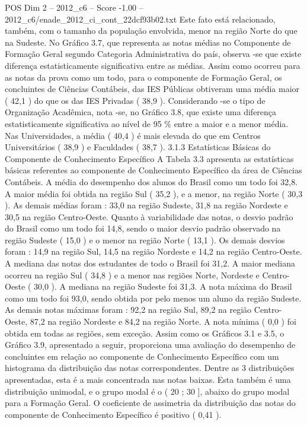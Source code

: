 \begin{textsample}{POS Dim 2 – 2012\_c6 – Score -1.00 – 2012\_c6/enade\_2012\_ci\_cont\_22dcf93b02.txt}
Este fato está relacionado, também, com o tamanho da população envolvida, menor na região Norte do que na Sudeste.
No Gráfico 3.7, que representa as notas médias no Componente de Formação Geral segundo Categoria Administrativa do país, observa -se que existe diferença estatisticamente significativa entre as médias.
Assim como ocorreu para as notas da prova como um todo, para o componente de Formação Geral, os concluintes de Ciências Contábeis, das IES Públicas obtiveram uma média maior ( 42,1 ) do que os das IES Privadas ( 38,9 ).
Considerando -se o tipo de Organização Acadêmica, nota -se, no Gráfico 3.8, que existe uma diferença estatisticamente significativa ao nível de 95 \% entre a maior e a menor média.
Nas Universidades, a média ( 40,4 ) é mais elevada do que em Centros Universitários ( 38,9 ) e Faculdades ( 38,7 ). 3.1.3 Estatísticas Básicas do Componente de Conhecimento Específico A Tabela 3.3 apresenta as estatísticas básicas referentes ao componente de Conhecimento Específico da área de Ciências Contábeis.
A média do desempenho dos alunos do Brasil como um todo foi 32,8.
A maior média foi obtida na região Sul ( 35,2 ), e a menor, na região Norte ( 30,3 ).
As demais médias foram : 33,0 na região Sudeste, 31,8 na região Nordeste e 30,5 na região Centro-Oeste.
Quanto à variabilidade das notas, o desvio padrão do Brasil como um todo foi 14,8, sendo o maior desvio padrão observado na região Sudeste ( 15,0 ) e o menor na região Norte ( 13,1 ).
Os demais desvios foram : 14,9 na região Sul, 14,5 na região Nordeste e 14,2 na região Centro-Oeste.
A mediana das notas dos estudantes de todo o Brasil foi 31,2.
A maior mediana ocorreu na região Sul ( 34,8 ) e a menor nas regiões Norte, Nordeste e Centro-Oeste ( 30,0 ).
A mediana na região Sudeste foi 31,3.
A nota máxima do Brasil como um todo foi 93,0, sendo obtida por pelo menos um aluno da região Sudeste.
As demais notas máximas foram : 92,2 na região Sul, 89,2 na região Centro-Oeste, 87,2 na região Nordeste e 84,2 na região Norte.
A nota mínima ( 0,0 ) foi obtida em todas as regiões, sem exceção.
Assim como os Gráficos 3.1 e 3.5, o Gráfico 3.9, apresentado a seguir, proporciona uma avaliação do desempenho de concluintes em relação ao componente de Conhecimento Específico com um histograma da distribuição das notas correspondentes.
Dentre as 3 distribuições apresentadas, esta é a mais concentrada nas notas baixas.
Esta também é uma distribuição unimodal, e o grupo modal é o ( 20 ; 30 ], abaixo do grupo modal para a Formação Geral.
O coeficiente de assimetria da distribuição das notas do componente de Conhecimento Específico é positivo ( 0,41 ).

\end{textsample}
